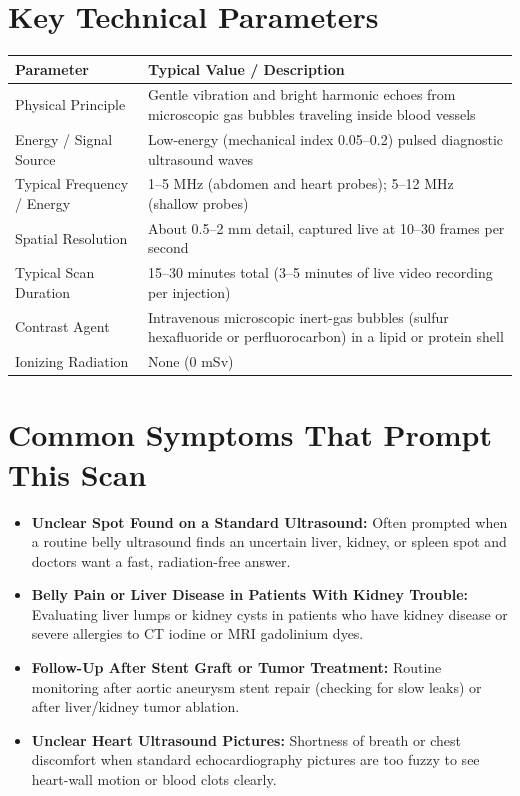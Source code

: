 \section{Key Technical Parameters}

\noindent
\begin{tabularx}{\textwidth}{@{}l X@{}}
\toprule
\textbf{Parameter} & \textbf{Typical Value / Description} \\
\midrule
Physical Principle & Gentle vibration and bright harmonic echoes from microscopic gas bubbles traveling inside blood vessels \\
Energy / Signal Source & Low-energy (mechanical index 0.05--0.2) pulsed diagnostic ultrasound waves \\
Typical Frequency / Energy & 1--5 MHz (abdomen and heart probes); 5--12 MHz (shallow probes) \\
Spatial Resolution & About 0.5--2 mm detail, captured live at 10--30 frames per second \\
Typical Scan Duration & 15--30 minutes total (3--5 minutes of live video recording per injection) \\
Contrast Agent & Intravenous microscopic inert-gas bubbles (sulfur hexafluoride or perfluorocarbon) in a lipid or protein shell \\
Ionizing Radiation & None (0 mSv) \\
\bottomrule
\end{tabularx}

\section{Common Symptoms That Prompt This Scan}
\begin{itemize}
    \item \textbf{Unclear Spot Found on a Standard Ultrasound:} Often prompted when a routine belly ultrasound finds an uncertain liver, kidney, or spleen spot and doctors want a fast, radiation-free answer.
    \item \textbf{Belly Pain or Liver Disease in Patients With Kidney Trouble:} Evaluating liver lumps or kidney cysts in patients who have kidney disease or severe allergies to CT iodine or MRI gadolinium dyes.
    \item \textbf{Follow-Up After Stent Graft or Tumor Treatment:} Routine monitoring after aortic aneurysm stent repair (checking for slow leaks) or after liver/kidney tumor ablation.
    \item \textbf{Unclear Heart Ultrasound Pictures:} Shortness of breath or chest discomfort when standard echocardiography pictures are too fuzzy to see heart-wall motion or blood clots clearly.
\end{itemize}


